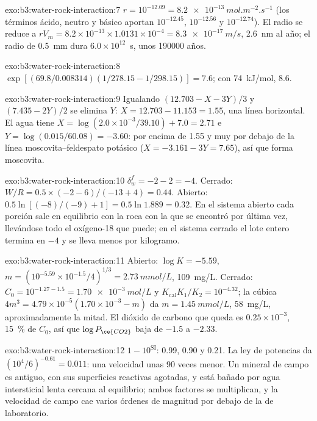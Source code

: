 \begin{solution}{exo:b3:water-rock-interaction:7}
$r = 10^{-12.09} = \qty{8.2e-13}{mol.m^{-2}.s^{-1}}$ (los términos ácido, neutro y
básico aportan $10^{-12.45}$, $10^{-12.56}$ y $10^{-12.74}$). El radio se
reduce a $rV_m = 8.2\times10^{-13}\times1.0131\times10^{-4} =
\qty{8.3e-17}{m/s}$, \qty{2.6}{nm} al año; el radio de \qty{0.5}{mm} dura
$6.0\times10^{12}$~s, unos \num{190000} años.
\end{solution}

\begin{solution}{exo:b3:water-rock-interaction:8}
$\exp[(69.8/0.008314)(1/278.15 - 1/298.15)] = 7.6$; con
\qty{74}{kJ/mol}, 8.6.
\end{solution}

\begin{solution}{exo:b3:water-rock-interaction:9}
Igualando $(12.703 - X - 3Y)/3$ y $(7.435 - 2Y)/2$ se elimina $Y$: $X =
12.703 - 11.153 = 1.55$, una línea horizontal. El agua tiene $X = \log(2.0\times
10^{-3}/39.10) + 7.0 = 2.71$ e $Y = \log(0.015/60.08) = -3.60$: por encima de 1.55
y muy por debajo de la línea moscovita--feldespato potásico ($X = -3.161 - 3Y = 7.65$),
así que forma moscovita.
\end{solution}

\begin{solution}{exo:b3:water-rock-interaction:10}
$\delta_w^f = -2 - 2 = -4$. Cerrado: $W/R = 0.5\times(-2 - 6)/(-13 + 4) =
0.44$. Abierto: $0.5\ln[(-8)/(-9) + 1] = 0.5\ln1.889 = 0.32$. En el sistema abierto cada
porción sale en equilibrio con la roca con la que se encontró por última vez, llevándose
todo el oxígeno-18 que puede; en el sistema cerrado el lote entero termina en $-4$ y
se lleva menos por kilogramo.
\end{solution}

\begin{solution}{exo:b3:water-rock-interaction:11}
Abierto: $\log K = -5.59$, $m = (10^{-5.59}\times10^{-1.5}/4)^{1/3} =
\qty{2.73}{mmol/L}$, \qty{109}{mg/L}. Cerrado: $C_0 = 10^{-1.27 - 1.5} =
\qty{1.70e-3}{mol/L}$ y $K_{\mathrm{cal}}K_1/K_2 = 10^{-4.32}$; la cúbica
$4m^3 = 4.79\times10^{-5}(1.70\times10^{-3} - m)$ da $m =
\qty{1.45}{mmol/L}$, \qty{58}{mg/L}, aproximadamente la mitad. El dióxido de carbono que queda es
$0.25\times10^{-3}$, \qty{15}{\percent} de $C_0$, así que $\log P_{\ce{CO2}}$ baja
de $-1.5$ a $-2.33$.
\end{solution}

\begin{solution}{exo:b3:water-rock-interaction:12}
$1 - 10^{\mathrm{SI}}$: 0.99, 0.90 y 0.21. La ley de potencias da
$(10^4/6)^{-0.61} = 0.011$: una velocidad unas 90 veces menor. Un mineral de campo es
antiguo, con sus superficies reactivas agotadas, y está bañado por agua intersticial lenta
cercana al equilibrio; ambos factores se multiplican, y la velocidad de campo cae
varios órdenes de magnitud por debajo de la de laboratorio.
\end{solution}

